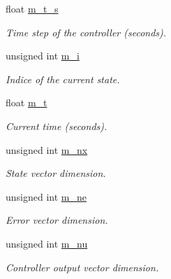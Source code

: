 \begin{DoxyCompactItemize}
float \hyperlink{classStateSpaceController_a6bac91eca3b49d992f63044e67ba1029}{m\+\_\+t\+\_\+s}
\begin{DoxyCompactList}\small\item\em Time step of the controller (seconds). \end{DoxyCompactList}\item 
unsigned int \hyperlink{classStateSpaceController_acdeb5cd37612bfb9553b5d726108c4df}{m\+\_\+i}
\begin{DoxyCompactList}\small\item\em Indice of the current state. \end{DoxyCompactList}\item 
float \hyperlink{classStateSpaceController_ab81980fe7a53ffa3d7269856b2729573}{m\+\_\+t}
\begin{DoxyCompactList}\small\item\em Current time (seconds). \end{DoxyCompactList}\item 
\mbox{\label{classStateSpaceController_a63b95d1a14d33d4a7671f57521057c4f}} 
unsigned int \hyperlink{classStateSpaceController_a63b95d1a14d33d4a7671f57521057c4f}{m\+\_\+nx}
\begin{DoxyCompactList}\small\item\em State vector dimension. \end{DoxyCompactList}\item 
\mbox{\label{classStateSpaceController_afc197780314b775404001f2a365f93d2}} 
unsigned int \hyperlink{classStateSpaceController_afc197780314b775404001f2a365f93d2}{m\+\_\+ne}
\begin{DoxyCompactList}\small\item\em Error vector dimension. \end{DoxyCompactList}\item 
\mbox{\label{classStateSpaceController_a35ba10ea16df2f78eface03879a1669b}} 
unsigned int \hyperlink{classStateSpaceController_a35ba10ea16df2f78eface03879a1669b}{m\+\_\+nu}
\begin{DoxyCompactList}\small\item\em Controller output vector dimension. \end{DoxyCompactList}\item 
\mbox{\label{classStateSpaceController_a87e713818628a55b12123cc60ef3c8f8}} 

\end{DoxyCompactItemize}
